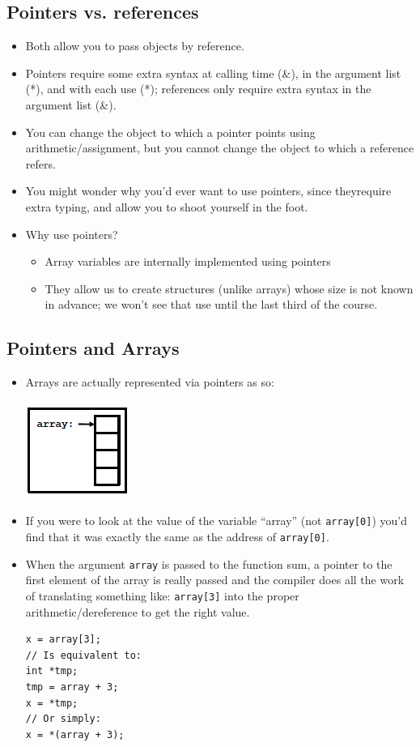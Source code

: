 \subsection{Pointers vs. references}
\begin{itemize}
	\item Both allow you to pass objects by reference.
	\item Pointers require some extra syntax at calling time (\&), in the argument list (*), and with each use (*); references only require extra syntax in the argument list (\&).
	\item You can change the object to which a pointer points using arithmetic/assignment, but you cannot change the object to which a reference refers.
	\item You might wonder why you’d ever want to use pointers, since theyrequire extra typing, and allow you to shoot yourself in the foot.
	\item Why use pointers?
	\begin{itemize}
		\item Array variables are internally implemented using pointers
		\item They allow us to create structures (unlike arrays) whose size is not known in advance; we won't see that use until the last third of the course.
	\end{itemize}
\end{itemize}

\subsection{Pointers and Arrays}
\begin{itemize}
	\item Arrays are actually represented via pointers as so:
	\begin{center}
		\includegraphics{sections/lec7/array.png}
	\end{center}
	\item If you were to look at the value of the variable ``array'' (not \lstinline[style=C++]{array[0]}) you'd find that it was exactly the same as the address of \lstinline[style=C++]{array[0]}.
	\item When the argument \lstinline[style=C++]{array} is passed to the function sum, a pointer to the first element of the array is really passed and the compiler does all the work of translating something like: \lstinline[style=C++]{array[3]} into the proper arithmetic/dereference to get the right value.
\begin{lstlisting}[style=C++]
x = array[3];
// Is equivalent to:
int *tmp;
tmp = array + 3;
x = *tmp;
// Or simply:
x = *(array + 3);
\end{lstlisting}
\end{itemize}

